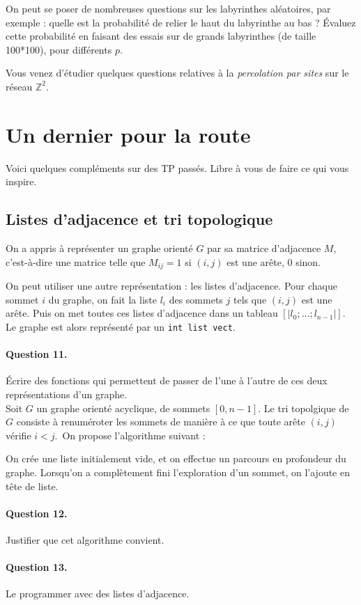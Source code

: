 \documentclass[10pt,a4paper]{article}
\begin{document}
On peut se poser de nombreuses questions sur les labyrinthes aléatoires, par 
exemple : quelle est la probabilité de relier le haut du labyrinthe au bas ? Évaluez 
cette probabilité en faisant des essais sur de grands labyrinthes (de taille 100*100), 
pour différents $p$.

Vous venez d'étudier quelques questions relatives à la \textit{percolation par 
sites} sur le réseau $\mathbb{Z}^2$.
\section{Un dernier pour la route}
Voici quelques compléments sur des TP passés. Libre à vous de faire ce qui vous 
inspire.
\subsection{Listes d'adjacence et tri topologique}
On a appris à représenter un graphe orienté $G$ par sa matrice d'adjacence $M$, 
c'est-à-dire une matrice telle que $M_{ij}=1$ si $(i,j)$ est une arête, $0$ sinon.

On peut utiliser une autre représentation : les listes d'adjacence. Pour chaque sommet 
$i$ du graphe, on fait la liste $l_i$ des sommets $j$ tels que $(i,j)$ est une arête. 
Puis on met toutes ces listes d'adjacence dans un tableau $[|l_0 ; ... ; l_{n-1}|]$. 
Le graphe est alors représenté par un \texttt{int list vect}.
\paragraph{Question 11.} Écrire des fonctions qui permettent de passer de l'une à 
l'autre de ces deux représentations d'un graphe.
\\

Soit $G$ un graphe orienté acyclique, de sommets $[0,n-1]$. Le tri topolgique de 
$G$ consiste à renuméroter les sommets de manière à ce que toute arête $(i,j)$ 
vérifie $i<j$. On propose l'algorithme suivant :

On crée une liste initialement vide, et on effectue un parcours en profondeur du 
graphe. Lorsqu'on a complètement fini l'exploration d'un sommet, on l'ajoute en 
tête de liste.

\paragraph{Question 12.} Justifier que cet algorithme convient.

\paragraph{Question 13.} Le programmer avec des listes d'adjacence.
\\
\end{document}
